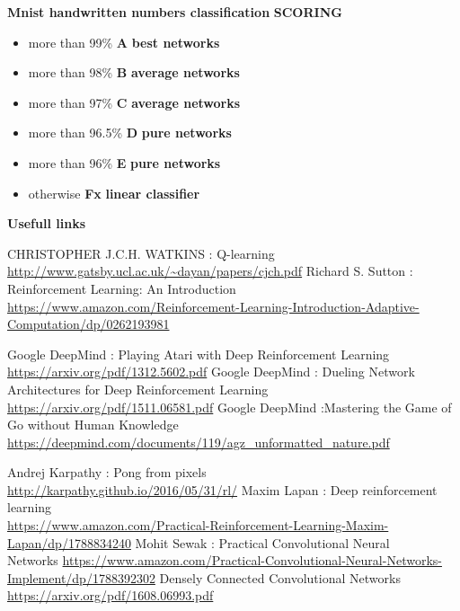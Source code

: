 \documentclass[xcolor=dvipsnames]{beamer}
\begin{document}
\begin{frame}{\bf Mnist handwritten numbers classification}
{\bf SCORING}
\begin{itemize}
\item more than 99\%  {\bf A} {\bf \color{green} best networks}
\item more than 98\%  {\bf B}  {\bf \color{blue} average networks}
\item more than 97\%  {\bf C}  {\bf \color{blue} average networks}
\item more than 96.5\%  {\bf D}   {\bf \color{red} pure networks}
\item more than 96\%  {\bf E}  {\bf \color{red} pure networks}
\item otherwise  {\bf Fx} {\bf \color{gray} linear classifier}

\end{itemize}

\end{frame}


\begin{frame}{\bf Usefull links}

{\tiny
  \begin{thebibliography}{9}
    \bibitem {}CHRISTOPHER  J.C.H. WATKINS : Q-learning \\ \url{http://www.gatsby.ucl.ac.uk/~dayan/papers/cjch.pdf}
    \bibitem {}Richard S. Sutton : Reinforcement Learning: An Introduction \\ \url{https://www.amazon.com/Reinforcement-Learning-Introduction-Adaptive-Computation/dp/0262193981}

    \bibitem {}Google DeepMind : Playing Atari with Deep Reinforcement Learning \\ \url{https://arxiv.org/pdf/1312.5602.pdf}
    \bibitem {}Google DeepMind : Dueling Network Architectures for Deep Reinforcement Learning \\ \url{https://arxiv.org/pdf/1511.06581.pdf}
    \bibitem {}Google DeepMind :Mastering the Game of Go without Human Knowledge \\ \url{https://deepmind.com/documents/119/agz_unformatted\_nature.pdf}

    \bibitem {}Andrej Karpathy : Pong from pixels \\ \url{http://karpathy.github.io/2016/05/31/rl/}
    \bibitem {}Maxim Lapan : Deep reinforcement learning \\ \url{https://www.amazon.com/Practical-Reinforcement-Learning-Maxim-Lapan/dp/1788834240}
    \bibitem {}Mohit Sewak : Practical Convolutional Neural \\ Networks \url{https://www.amazon.com/Practical-Convolutional-Neural-Networks-Implement/dp/1788392302}
    \bibitem {}Densely Connected Convolutional Networks \\ \url{https://arxiv.org/pdf/1608.06993.pdf}
  \end{thebibliography}
}

\end{frame}
\end{document}
